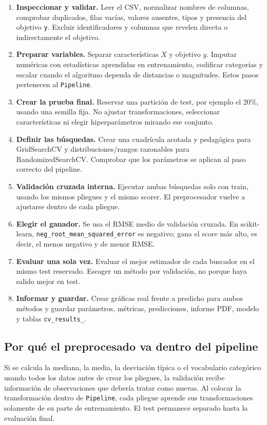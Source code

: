 \documentclass[11pt,a4paper]{article}
\begin{document}
\begin{enumerate}
\item \textbf{Inspeccionar y validar.} Leer el CSV, normalizar nombres de columnas, comprobar duplicados, filas vacías, valores ausentes, tipos y presencia del objetivo \texttt{y}. Excluir identificadores y columnas que revelen directa o indirectamente el objetivo.
\item \textbf{Preparar variables.} Separar características $X$ y objetivo $y$. Imputar numéricas con estadísticas aprendidas en entrenamiento, codificar categorías y escalar cuando el algoritmo dependa de distancias o magnitudes. Estos pasos pertenecen al \texttt{Pipeline}.
\item \textbf{Crear la prueba final.} Reservar una partición de test, por ejemplo el 20\%, usando una semilla fija. No ajustar transformaciones, seleccionar características ni elegir hiperparámetros mirando ese conjunto.
\item \textbf{Definir las búsquedas.} Crear una cuadrícula acotada y pedagógica para GridSearchCV y distribuciones/rangos razonables para RandomizedSearchCV. Comprobar que los parámetros se aplican al paso correcto del pipeline.
\item \textbf{Validación cruzada interna.} Ejecutar ambas búsquedas solo con train, usando los mismos pliegues y el mismo scorer. El preprocesador vuelve a ajustarse dentro de cada pliegue.
\item \textbf{Elegir el ganador.} Se usa el RMSE medio de validación cruzada. En scikit-learn, \texttt{neg\_root\_mean\_squared\_error} es negativo; gana el score más alto, es decir, el menos negativo y de menor RMSE.
\item \textbf{Evaluar una sola vez.} Evaluar el mejor estimador de cada buscador en el mismo test reservado. Escoger un método por validación, no porque haya salido mejor en test.
\item \textbf{Informar y guardar.} Crear gráficas real frente a predicho para ambos métodos y guardar parámetros, métricas, predicciones, informe PDF, modelo y tablas \texttt{cv\_results\_}.
\end{enumerate}

\subsection{Por qué el preprocesado va dentro del pipeline}
Si se calcula la mediana, la media, la desviación típica o el vocabulario categórico usando todos los datos antes de crear los pliegues, la validación recibe información de observaciones que debería tratar como nuevas. Al colocar la transformación dentro de \texttt{Pipeline}, cada pliegue aprende sus transformaciones solamente de su parte de entrenamiento. El test permanece separado hasta la evaluación final.
\end{document}
